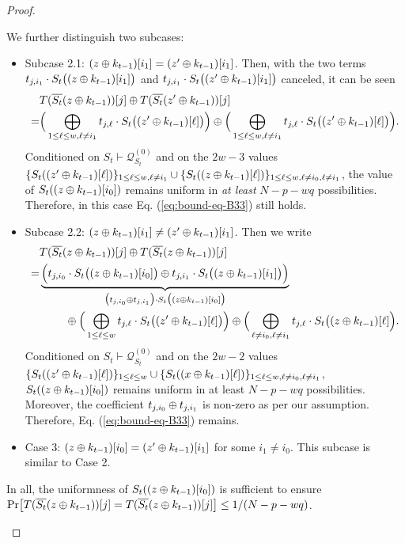 \begin{proof}
\begin{itemize}
	We further distinguish two subcases:
	\begin{itemize}
		\item Subcase 2.1: $(z\oplus k_{t-1})[i_1]=(z'\oplus k_{t-1})[i_1]$. Then, with the two terms $t_{j,i_1}\cdot S_t\big((z\oplus k_{t-1})[i_1]\big)$ and $t_{j,i_1}\cdot S_t\big((z'\oplus k_{t-1})[i_1]\big)$ canceled, it can be seen
		\begin{align*}
		&  T(\overline{S_t}(z\oplus k_{t-1}))[j]\oplus T(\overline{S_t}(z'\oplus k_{t-1}))[j]       \\
		= &
		\Big(\bigoplus_{1\leq\ell\leq w,\ell\neq i_1}t_{j,\ell}\cdot S_t\big((z'\oplus k_{t-1})[\ell]\big)\Big)\oplus
		\Big(\bigoplus_{1\leq\ell\leq w,\ell\neq i_1}t_{j,\ell}\cdot S_t\big((z'\oplus k_{t-1})[\ell]\big)\Big)   .
		\end{align*}
		Conditioned on $S_t\vdash\mathcal{Q}_{S_t}^{(0)}$ and on the $2w-3$ values $\{S_t((z'\oplus k_{t-1})[\ell])\}_{1\leq \ell\leq w,\ell\neq i_1}\cup\{S_t((z\oplus k_{t-1})[\ell])\}_{1\leq \ell\leq w,\ell\neq i_0,\ell\neq i_1}$, the value of $S_t((z\oplus k_{t-1})[i_0])$ remains uniform in {\it at least} $N-p-wq$ possibilities. Therefore, in this case Eq. (\ref{eq:bound-eq-B33}) still holds.
		\item Subcase 2.2: $(z\oplus k_{t-1})[i_1]\neq(z'\oplus k_{t-1})[i_1]$. Then we write
		\begin{align*}
		&  T(\overline{S_t}(z\oplus k_{t-1}))[j]\oplus T(\overline{S_t}(z\oplus k_{t-1}))[j]       \\
		= &   \underbrace{\Big(t_{j,i_0}\cdot S_t\big((z\oplus k_{t-1})[i_0]\big)
			\oplus
			t_{j,i_1}\cdot S_t\big((z\oplus k_{t-1})[i_1]\big)\Big)}_{\big(t_{j,i_0}\oplus t_{j,i_1}\big)\cdot S_t\big((z\oplus k_{t-1})[i_0]\big)}   	\\
		&\ \ \ \ \ \ \ \oplus
		\Big(\bigoplus_{1\leq\ell\leq w}t_{j,\ell}\cdot S_t\big((z'\oplus k_{t-1})[\ell]\big)\Big)    \oplus
		\Big(\bigoplus_{\ell\neq i_0,\ell\neq i_1}t_{j,\ell}\cdot S_t\big((z\oplus k_{t-1})[\ell]\Big).
		\end{align*}
		Conditioned on $S_t\vdash\mathcal{Q}_{S_t}^{(0)}$ and on the $2w-2$ values $\{S_t((z'\oplus k_{t-1})[\ell])\}_{1\leq \ell\leq w}\cup\{S_t((x\oplus k_{t-1})[\ell])\}_{1\leq \ell\leq w,\ell\neq i_0,\ell\neq i_1}$, $S_t((z\oplus k_{t-1})[i_0])$ remains uniform in at least $N-p-wq$ possibilities. Moreover, the coefficient $t_{j,i_0}\oplus t_{j,i_1}$ is non-zero as per our assumption. Therefore, Eq. (\ref{eq:bound-eq-B33}) remains.
%
	\item Case 3: $(z\oplus k_{t-1})[i_0]=(z'\oplus k_{t-1})[i_1]$ for some $i_1\neq i_0$. This subcase is similar to Case 2.
\end{itemize}
%
In all, the uniformness of $S_t((z\oplus k_{t-1})[i_0])$ is sufficient to ensure ${\Pr}\big[T(\overline{S_t}(z\oplus k_{t-1}))[j]=T(\overline{S_t}(z\oplus k_{t-1}))[j]\big]\leq1/(N-p-wq)$.





\end{itemize}
\end{proof}
